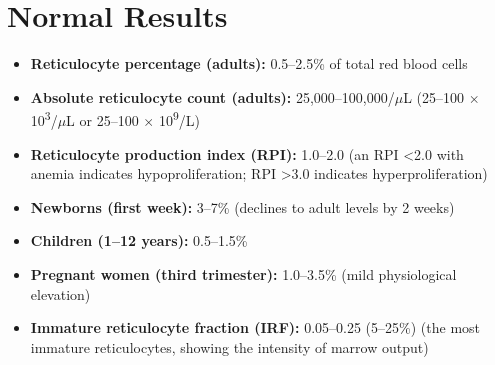 \section*{Normal Results}
\begin{itemize}
  \item \textbf{Reticulocyte percentage (adults):} 0.5--2.5\% of total red blood cells \cite{fischbach2023manual}
  \item \textbf{Absolute reticulocyte count (adults):} 25,000--100,000/$\mu$L (25--100 $\times$ 10\textsuperscript{3}/$\mu$L or 25--100 $\times$ 10\textsuperscript{9}/L)
  \item \textbf{Reticulocyte production index (RPI):} 1.0--2.0 (an RPI <2.0 with anemia indicates hypoproliferation; RPI >3.0 indicates hyperproliferation)
  \item \textbf{Newborns (first week):} 3--7\% (declines to adult levels by 2 weeks)
  \item \textbf{Children (1--12 years):} 0.5--1.5\%
  \item \textbf{Pregnant women (third trimester):} 1.0--3.5\% (mild physiological elevation)
  \item \textbf{Immature reticulocyte fraction (IRF):} 0.05--0.25 (5--25\%) (the most immature reticulocytes, showing the intensity of marrow output) \cite{piva2015clinical}
\end{itemize}

